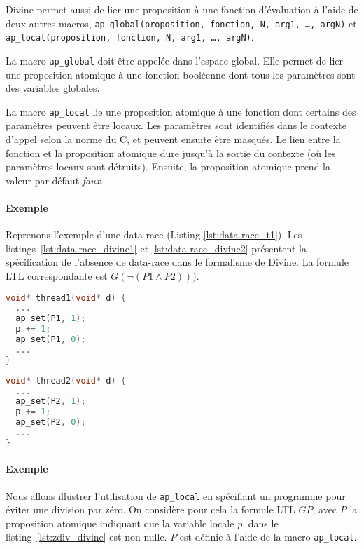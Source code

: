 Divine permet aussi de lier une proposition à une fonction d'évaluation à l'aide
de deux autres macros, \texttt{ap\_global(proposition, fonction, N, arg1, \dots,
  argN)} et\\
\texttt{ap\_local(proposition, fonction, N, arg1, \dots, argN)}.

La macro \texttt{ap\_global} doit être appelée dans l'espace global. Elle permet
de lier une proposition atomique à une fonction booléenne dont tous les
paramètres sont des variables globales.

La macro \texttt{ap\_local} lie une proposition atomique à une fonction dont
certains des paramètres peuvent être locaux. Les paramètres sont identifiés
dans le contexte d'appel selon la norme du C, et peuvent ensuite être masqués.
Le lien entre la fonction et la proposition atomique dure jusqu'à la sortie du
contexte (où les paramètres locaux sont détruits). Ensuite, la proposition
atomique prend la valeur par défaut \emph{faux}.

\paragraph{Exemple}
Reprenons l'exemple d'une data-race (Listing \ref{lst:data-race_t1}). Les
listings~\ref{lst:data-race_divine1} et \ref{lst:data-race_divine2} présentent
la spécification de l'absence de data-race dans le formalisme de Divine. La
formule \ac{LTL} correspondante est \(G(\lnot (P1 \land P2)))\).

\noindent\begin{minipage}{.45\textwidth}
  \begin{lstlisting}[language=C, frame=single, caption=Thread 1,
    label=lst:data-race_divine1]
void* thread1(void* d) {
  ...
  ap_set(P1, 1);
  p += 1;
  ap_set(P1, 0);
  ...
}
\end{lstlisting}
\end{minipage}\hfill
\begin{minipage}{.45\textwidth}
\begin{lstlisting}[language=C, frame=single, caption=Thread 2,
    label=lst:data-race_divine2]
void* thread2(void* d) {
  ...
  ap_set(P2, 1);
  p += 1;
  ap_set(P2, 0);
  ...
}
\end{lstlisting}
\end{minipage}

\paragraph{Exemple}
Nous allons illustrer l'utilisation de \texttt{ap\_local} en spécifiant un
programme pour éviter une division par zéro. On considère pour cela la formule
\ac{LTL} \(G P\), avec \(P\) la proposition atomique indiquant que la variable
locale \(p\), dans le listing~\ref{lst:zdiv_divine} est non nulle. \(P\) est
définie à l'aide de la macro \texttt{ap\_local}.

